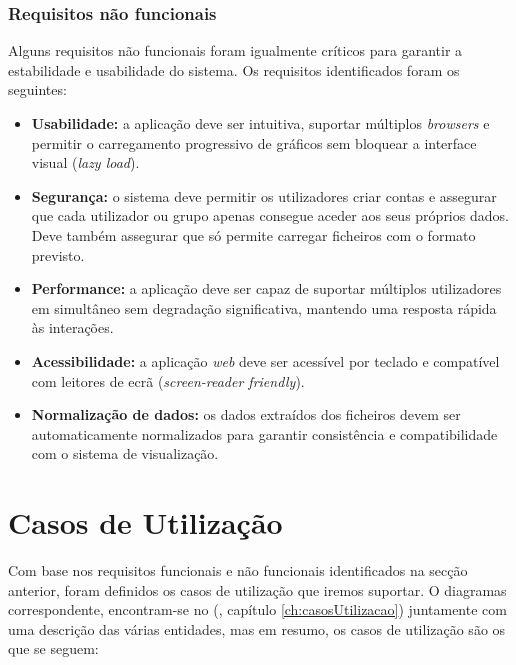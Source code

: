 \subsubsection{Requisitos não funcionais}

Alguns requisitos não funcionais foram igualmente críticos para garantir a estabilidade e usabilidade do sistema. Os requisitos identificados foram os seguintes:

\begin{itemize}
    \item \textbf{Usabilidade:} a aplicação deve ser intuitiva, suportar múltiplos \textit{browsers} e permitir o carregamento progressivo de gráficos sem bloquear a interface visual (\textit{lazy load}).
    
    \item \textbf{Segurança:} o sistema deve permitir os utilizadores criar contas e assegurar que cada utilizador ou grupo apenas consegue aceder aos seus próprios dados. Deve também assegurar que só permite carregar ficheiros com o formato previsto.
    
    \item \textbf{Performance:} a aplicação deve ser capaz de suportar múltiplos utilizadores em simultâneo sem degradação significativa, mantendo uma resposta rápida às interações.
    
    \item \textbf{Acessibilidade:} a aplicação \textit{web} deve ser acessível por teclado e compatível com leitores de ecrã (\textit{screen-reader friendly}).

    \item \textbf{Normalização de dados:} os dados extraídos dos ficheiros devem ser automaticamente normalizados para garantir consistência e compatibilidade com o sistema de visualização.

\end{itemize}

\section{Casos de Utilização}

Com base nos requisitos funcionais e não funcionais identificados na secção anterior, foram definidos os casos de utilização que iremos suportar. O diagramas correspondente, encontram-se no (\cf, capítulo \ref{ch:casosUtilizacao}) juntamente com uma descrição das várias entidades, mas em resumo, os casos de utilização são os que se seguem:

